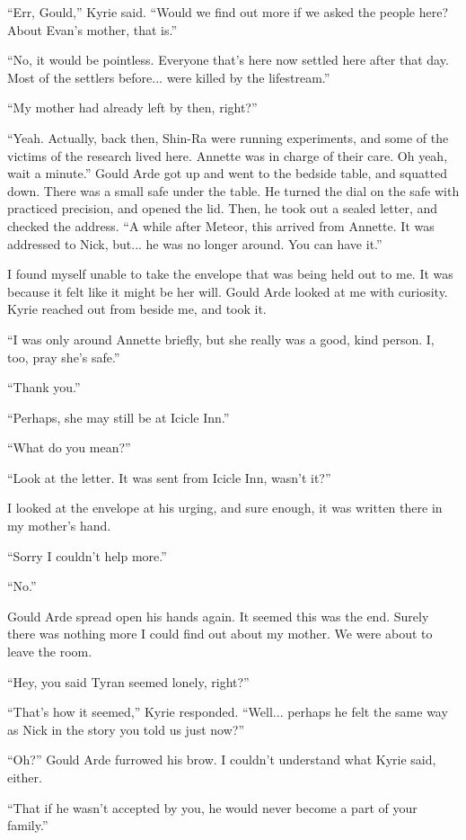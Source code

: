 \documentclass[oneside]{book}
\begin{document}
“Err, Gould,” Kyrie said. “Would we find out more if we asked the people here? About Evan’s mother, that is.”

“No, it would be pointless. Everyone that’s here now settled here after that day. Most of the settlers before... were killed by the lifestream.”

“My mother had already left by then, right?”

“Yeah. Actually, back then, Shin-Ra were running experiments, and some of the victims of the research lived here. Annette was in charge of their care. Oh yeah, wait a minute.” Gould Arde got up and went to the bedside table, and squatted down. There was a small safe under the table. He turned the dial on the safe with practiced precision, and opened the lid. Then, he took out a sealed letter, and checked the address. “A while after Meteor, this arrived from Annette. It was addressed to Nick, but... he was no longer around. You can have it.”

I found myself unable to take the envelope that was being held out to me. It was because it felt like it might be her will. Gould Arde looked at me with curiosity. Kyrie reached out from beside me, and took it.

“I was only around Annette briefly, but she really was a good, kind person. I, too, pray she’s safe.”

“Thank you.”

“Perhaps, she may still be at Icicle Inn.”

“What do you mean?”

“Look at the letter. It was sent from Icicle Inn, wasn’t it?”

I looked at the envelope at his urging, and sure enough, it was written there in my mother’s hand.

“Sorry I couldn’t help more.”

“No.”

Gould Arde spread open his hands again. It seemed this was the end. Surely there was nothing more I could find out about my mother. We were about to leave the room.

“Hey, you said Tyran seemed lonely, right?”

“That’s how it seemed,” Kyrie responded. “Well... perhaps he felt the same way as Nick in the story you told us just now?”

“Oh?” Gould Arde furrowed his brow. I couldn’t understand what Kyrie said, either.

“That if he wasn’t accepted by you, he would never become a part of your family.”
\end{document}
